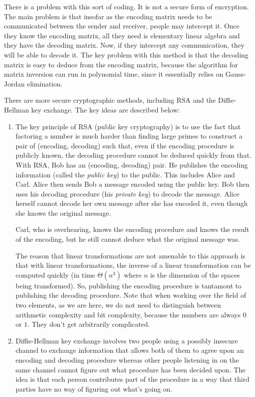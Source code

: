 \documentclass[10pt]{amsart}
\begin{document}
There is a problem with this sort of coding. It is not a secure form
of encryption. The main problem is that insofar as the encoding matrix
needs to be communicated between the sender and receiver, people may
intercept it. Once they know the encoding matrix, all they need is
elementary linear algebra and they have the decoding matrix. Now, if
they intercept any communication, they will be able to decode it. The
key problem with this method is that the decoding matrix is easy to
deduce from the encoding matrix, because the algorithm for matrix
inversion can run in polynomial time, since it essentially relies on
Gauss-Jordan elimination.

There are more secure cryptographic methods, including RSA and the
Diffie-Hellman key exchange. The key ideas are described below:

\begin{enumerate}
\item The key principle of RSA (public key cryptography) is to use the
  fact that factoring a number is much harder than finding large
  primes to construct a pair of (encoding, decoding) such that, even
  if the encoding procedure is publicly known, the decoding procedure
  cannot be deduced quickly from that. With RSA, Bob has an (encoding,
  decoding) pair. He publishes the encoding information (called the
  {\em public key}) to the public. This includes Alice and Carl. Alice
  then sends Bob a message encoded using the public key. Bob then uses
  his decoding procedure (his {\em private key}) to decode the
  message. Alice herself cannot decode her own message after she has
  encoded it, even though she knows the original message.

  Carl, who is overhearing, knows the encoding procedure and knows the
  result of the encoding, but he still cannot deduce what the original
  message was.

  The reason that linear transformations are not amenable to this
  approach is that with linear transformations, the inverse of a
  linear transformation can be computed quickly (in time $\Theta(n^3)$
  where $n$ is the dimension of the spaces being transformed). So,
  publishing the encoding procedure is tantamout to publishing the
  decoding procedure. Note that when working over the field of two
  elements, as we are here, we do not need to distinguish between
  arithmetic complexity and bit complexity, because the numbers are
  always $0$ or $1$. They don't get arbitrarily complicated.

\item Diffie-Hellman key exchange involves two people using a possibly
  insecure channel to exchange information that allows both of them to
  agree upon an encoding and decoding procedure whereas other people
  listening in on the same channel cannot figure out what procedure
  has been decided upon. The idea is that each person contributes part
  of the procedure in a way that third parties have no way of figuring
  out what's going on.

\end{enumerate}
\end{document}
